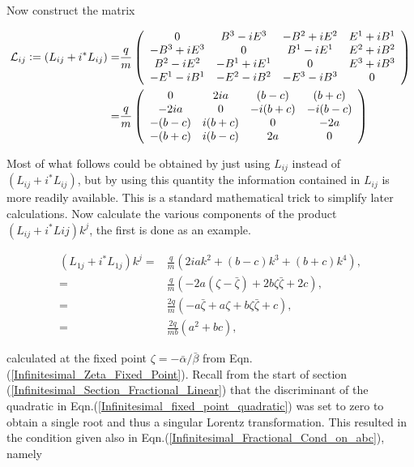 \noindent Now construct the matrix

\begin{align*}
\mathcal{L}_{ij} \vcentcolon = (L_{ij} + i ^*L_{ij}) = &
\frac{q}{m}
\left(
\begin{array}{cccc}
0           & B^3 - iE^3 & -B^2 + i E^2 & E^1 +iB^1 \\
-B^3+iE^3   & 0          & B^1 - i E^1  & E^2+iB^2 \\
B^2-iE^2    & -B^1 +iE^1 & 0            & E^3+iB^3 \\
-E^1 - iB^1 & -E^2-iB^2  & -E^3-iB^3    & 0        \\
\end{array}
\right) \\
= & 
\frac{q}{m}
\left(
\begin{array}{cccc}
0      & 2ia    & (b-c)   & (b+c)   \\
-2ia   & 0      & -i(b+c) & -i(b-c) \\
-(b-c) & i(b+c) & 0       & -2a     \\
-(b+c) & i(b-c) & 2a      & 0       \\
\end{array}
\right)
\end{align*}

\noindent Most of what follows could be obtained by just using $L_{ij}$ instead of $(L_{ij} + i ^*L_{ij})$, but by using this quantity the information contained in $L_{ij}$ is more readily available. This is a standard mathematical trick to simplify later calculations. Now calculate the various components of the product $(L_{ij} + i ^*L{ij}) k^j$, the first is done as an example. 

\begin{align*}
(L_{1j} + i ^*L_{1j}) k^j = & \frac{q}{m} (2iak^2 + (b-c)k^3 + (b+c)k^4), \\
                         = &\frac{q}{m} (-2a(\zeta - \bar{\zeta}) + 2b\zeta\bar{\zeta} + 2c), \\
                         = &\frac{2q}{m} (-a\bar{\zeta} + a\zeta + b\zeta\bar{\zeta} +c), \\
                         = &\frac{2q}{mb} (a^2 + bc), 
\end{align*}

\noindent calculated at the fixed point $\zeta = - \bar{\alpha} / {\bar{\beta}}$ from Eqn.(\ref{Infinitesimal_Zeta_Fixed_Point}). Recall from the start of section (\ref{Infinitesimal_Section_Fractional_Linear}) that the discriminant of the quadratic in Eqn.(\ref{Infinitesimal_fixed_point_quadratic}) was set to zero to obtain a single root and thus a singular Lorentz transformation. This resulted in the condition given also in Eqn.(\ref{Infinitesimal_Fractional_Cond_on_abc}), namely

